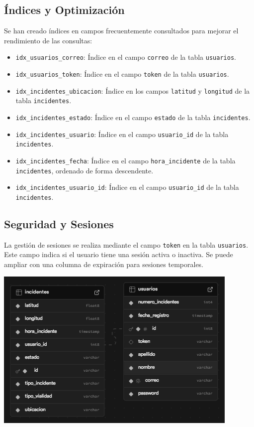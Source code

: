 \subsection*{Índices y Optimización}
Se han creado índices en campos frecuentemente consultados para mejorar el rendimiento de las consultas:
\begin{itemize}
    \item \texttt{idx\_usuarios\_correo}: Índice en el campo \texttt{correo} de la tabla \texttt{usuarios}.
    \item \texttt{idx\_usuarios\_token}: Índice en el campo \texttt{token} de la tabla \texttt{usuarios}.
    \item \texttt{idx\_incidentes\_ubicacion}: Índice en los campos \texttt{latitud} y \texttt{longitud} de la tabla \texttt{incidentes}.
    \item \texttt{idx\_incidentes\_estado}: Índice en el campo \texttt{estado} de la tabla \texttt{incidentes}.
    \item \texttt{idx\_incidentes\_usuario}: Índice en el campo \texttt{usuario\_id} de la tabla \texttt{incidentes}.
    \item \texttt{idx\_incidentes\_fecha}: Índice en el campo \texttt{hora\_incidente} de la tabla \texttt{incidentes}, ordenado de forma descendente.
    \item \texttt{idx\_incidentes\_usuario\_id}: Índice en el campo \texttt{usuario\_id} de la tabla \texttt{incidentes}.
\end{itemize}

\subsection*{Seguridad y Sesiones}
La gestión de sesiones se realiza mediante el campo \texttt{token} en la tabla \texttt{usuarios}. Este campo indica si el usuario tiene una sesión activa o inactiva. Se puede ampliar con una columna de expiración para sesiones temporales.

\begin{center}
    \includegraphics[scale = 1]{IMA/bd-bumper.png}
\end{center}